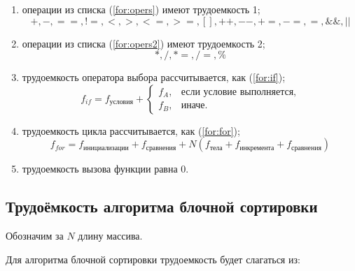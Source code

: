 \begin{enumerate}
	\item операции из списка (\ref{for:opers}) имеют трудоемкость 1;
	\begin{equation}
		\label{for:opers}
		+, -, ==, !=, <, >, <=, >=, [], ++, {-}-, +=, -=, =, \&\&, ||
	\end{equation}
	\item операции из списка (\ref{for:opers2}) имеют трудоемкость 2;
	\begin{equation}
		\label{for:opers2}
		*, /, *=, /=, \%
	\end{equation}
	\item трудоемкость оператора выбора  рассчитывается, как (\ref{for:if});
	\begin{equation}
		\label{for:if}
		f_{if} = f_{\text{условия}} +
		\begin{cases}
			f_A, & \text{если условие выполняется,}\\
			f_B, & \text{иначе.}
		\end{cases}
	\end{equation}
	\item трудоемкость цикла рассчитывается, как (\ref{for:for});
	\begin{equation}
		\label{for:for}
		f_{for} = f_{\text{инициализации}} + f_{\text{сравнения}} + N(f_{\text{тела}} + f_{\text{инкремента}} + f_{\text{сравнения}})
	\end{equation}
	\item трудоемкость вызова функции равна 0.
\end{enumerate}

\subsection{Трудоёмкость алгоритма блочной сортировки}

Обозначим за $N$ длину массива.

Для алгоритма блочной сортировки трудоемкость будет слагаться из:

